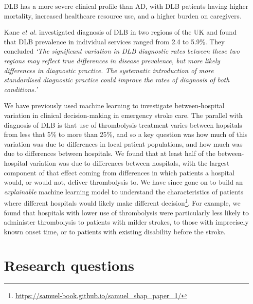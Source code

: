 \documentclass{article}
\begin{document}
DLB has a more severe clinical profile than AD, with DLB patients having higher mortality\cite{williams_survival_2006}, increased healthcare resource use\cite{bostrom_patients_2007}, and a higher burden on caregivers\cite{zweig_lewy_2014, ricci_clinical_2009}.

Kane \emph{et al.}\cite{kane_clinical_2018} investigated diagnosis of DLB in two regions of the UK and found that DLB prevalence in individual services ranged from 2.4 to 5.9\%. They concluded \emph{`The significant variation in DLB diagnostic rates between these two regions may reflect true differences in disease prevalence, but more likely differences in diagnostic practice. The systematic introduction of more standardised diagnostic practice could improve the rates of diagnosis of both conditions.'}

We have previously used machine learning to investigate between-hospital variation in clinical decision-making in emergency stroke care\cite{allen_stoke, allen_nihr}. The parallel with diagnosis of DLB is that use of thrombolysis treatment varies between hopsitals from less that 5\% to more than 25\%, and so a key question was how much of this variation was due to differences in local patient populations, and how much was due to differences between hospitals. We found that at least half of the between-hospital variation was due to differences between hospitals, with the largest component of that effect coming from differences in which patients a hospital would, or would not, deliver thrombolysis to. We have since gone on to build an \emph{explainable} machine learning model to understand the characteristics of patients where different hospitals would likely make different decision\footnote{\url{https://samuel-book.github.io/samuel_shap_paper_1/}}. For example, we found that hospitals with lower use of thrombolysis were particularly less likely to administer thrombolysis to patients with milder strokes, to those with imprecisely known onset time, or to patients with existing disability before the stroke.


\section{Research questions}
\end{document}
